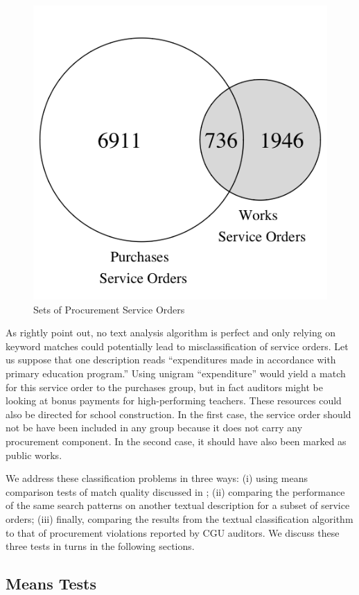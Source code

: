 \documentclass[11pt]{article}
\begin{document}
\begin{figure}[!htbp]
\caption{\label{fig:venn} Sets of Procurement Service Orders}
{\centering \includegraphics[width=0.3\linewidth]{venn}

}
\end{figure}

As \citet{GrimmerTextDataPromise2013a} rightly point out, no text analysis algorithm is perfect and only relying on keyword matches could potentially lead to misclassification of service orders. Let us suppose that one description reads ``expenditures made in accordance with primary education program.'' Using unigram ``expenditure'' would yield a match for this service order to the purchases group, but in fact auditors might be looking at bonus payments for high-performing teachers. These resources could also be directed for school construction. In the first case, the service order should not be have been included in any group because it does not carry any procurement component. In the second case, it should have also been marked as public works.

We address these classification problems in three ways: (i) using means comparison tests of match quality discussed in \citet{AssumpcaotextfindDataDrivenText2018}; (ii) comparing the performance of the same search patterns on another textual description for a subset of service orders; (iii) finally, comparing the results from the textual classification algorithm to that of procurement violations reported by CGU auditors. We discuss these three tests in turns in the following sections.

\subsection{Means Tests}\label{subsec:quality1}
\end{document}
